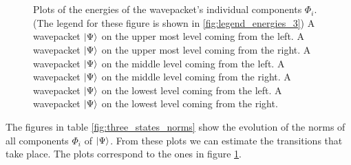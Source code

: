 \begin{figure}
{  } \\
   \\
  \caption[Plots of the energies of the wavepacket's individual components $\Phi_i$.]{
    Plots of the energies of the wavepacket's individual components $\Phi_i$. (The legend for these figure
    is shown in \ref{fig:legend_energies_3})
     A wavepacket $\Ket{\Psi}$ on the upper most level coming from the left.
     A wavepacket $\Ket{\Psi}$ on the upper most level coming from the right.
     A wavepacket $\Ket{\Psi}$ on the middle level coming from the left.
     A wavepacket $\Ket{\Psi}$ on the middle level coming from the right.
     A wavepacket $\Ket{\Psi}$ on the lowest level coming from the left.
     A wavepacket $\Ket{\Psi}$ on the lowest level coming from the right.
    \label{fig:three_states_energies}
  }
\end{figure}

The figures in table \ref{fig:three_states_norms} show the evolution of the norms
of all components $\Phi_i$ of $\Ket{\Psi}$. From these plots we can estimate the
transitions that take place. The plots correspond to the ones in figure \ref{fig:three_states_energies}.

